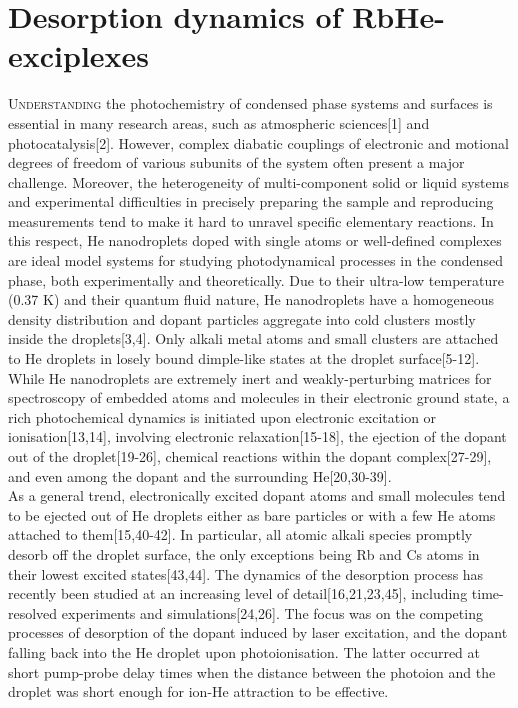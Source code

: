 	\section{Desorption dynamics of RbHe-exciplexes}
		\lettrine[lines=3,findent=3pt,nindent=0pt]{U}{nderstanding} the photochemistry of condensed phase systems and surfaces is essential in many research areas, such as atmospheric sciences[1] and photocatalysis[2]. However, complex diabatic couplings of electronic and motional degrees of freedom of various subunits of the system often present a major challenge. Moreover, the heterogeneity of multi-component solid or liquid systems and experimental difficulties in precisely preparing the sample and reproducing measurements tend to make it hard to unravel specific elementary reactions. In this respect, He nanodroplets doped with single atoms or well-defined complexes are ideal model systems for studying photodynamical processes in the condensed phase, both experimentally and theoretically. Due to their ultra-low temperature (0.37 K) and their quantum fluid nature, He nanodroplets have a homogeneous density distribution and dopant particles aggregate into cold clusters mostly inside the droplets[3,4]. Only alkali metal atoms and small clusters are attached to He droplets in losely bound dimple-like states at the droplet surface[5-12].\\

		While He nanodroplets are extremely inert and weakly-perturbing matrices for spectroscopy of embedded atoms and molecules in their electronic ground state, a rich photochemical dynamics is initiated upon electronic excitation or ionisation[13,14], involving electronic relaxation[15-18], the ejection of the dopant out of the droplet[19-26], chemical reactions within the dopant complex[27-29], and even among the dopant and the surrounding He[20,30-39].\\

		As a general trend, electronically excited dopant atoms and small molecules tend to be ejected out of He droplets either as bare particles or with a few He atoms attached to them[15,40-42]. In particular, all atomic alkali species promptly desorb off the droplet surface, the only exceptions being Rb and Cs atoms in their lowest excited states[43,44]. The dynamics of the desorption process has recently been studied at an increasing level of detail[16,21,23,45], including time-resolved experiments and simulations[24,26]. The focus was on the competing processes of desorption of the dopant induced by laser excitation, and the dopant falling back into the He droplet upon photoionisation. The latter occurred at short pump-probe delay times when the distance between the photoion and the droplet was short enough for ion-He attraction to be effective.\\

